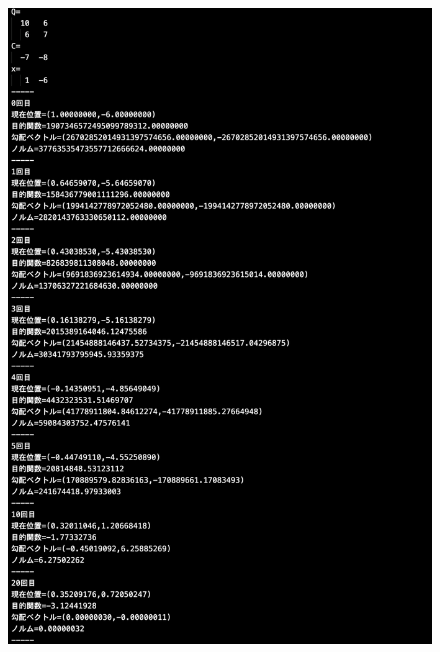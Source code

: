 \documentclass[12pt]{jarticle}
\begin{document}
\clearpage
\begin{figure}[h]
    \begin{center}
        \includegraphics[scale=0.2]{kadai1_1s_out2_3_1.png}
    \end{center}
    \begin{minipage}{0.5\hsize}
        \begin{center}

\end{center}
\end{minipage}
\end{figure}
\end{document}
